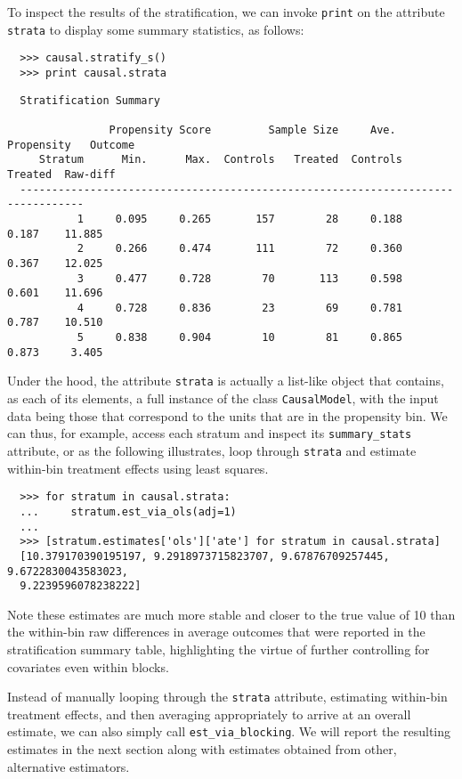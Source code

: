 \documentclass[12pt]{article}
\theoremstyle{definition}
\theoremstyle{definition}
\theoremstyle{definition}
\theoremstyle{remark}
\begin{document}
To inspect the results of the stratification, we can invoke \texttt{print} on the attribute \texttt{strata} to display some summary statistics, as follows:
\begin{verbatim}
  >>> causal.stratify_s()
  >>> print causal.strata
\end{verbatim}
\begin{verbatim}
  Stratification Summary
  
                Propensity Score         Sample Size     Ave. Propensity   Outcome
     Stratum      Min.      Max.  Controls   Treated  Controls   Treated  Raw-diff
  --------------------------------------------------------------------------------
           1     0.095     0.265       157        28     0.188     0.187    11.885
           2     0.266     0.474       111        72     0.360     0.367    12.025
           3     0.477     0.728        70       113     0.598     0.601    11.696
           4     0.728     0.836        23        69     0.781     0.787    10.510
           5     0.838     0.904        10        81     0.865     0.873     3.405
\end{verbatim}

Under the hood, the attribute \texttt{strata} is actually a list-like object that contains, as each of its elements, a full instance of the class \texttt{CausalModel}, with the input data being those that correspond to the units that are in the propensity bin. We can thus, for example, access each stratum and inspect its \texttt{summary\_stats} attribute, or as the following illustrates, loop through \texttt{strata} and estimate within-bin treatment effects using least squares.
\begin{verbatim}
  >>> for stratum in causal.strata:
  ...     stratum.est_via_ols(adj=1)
  ... 
  >>> [stratum.estimates['ols']['ate'] for stratum in causal.strata]
  [10.379170390195197, 9.2918973715823707, 9.67876709257445, 9.6722830043583023,
  9.2239596078238222]
\end{verbatim}

Note these estimates are much more stable and closer to the true value of 10 than the within-bin raw differences in average outcomes that were reported in the stratification summary table, highlighting the virtue of further controlling for covariates even within blocks.

Instead of manually looping through the \texttt{strata} attribute, estimating within-bin treatment effects, and then averaging appropriately to arrive at an overall estimate, we can also simply call \texttt{est\_via\_blocking}. We will report the resulting estimates in the next section along with estimates obtained from other, alternative estimators.
\end{document}
